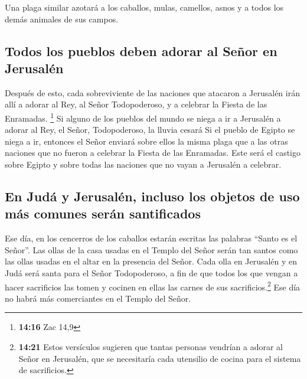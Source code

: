  Una plaga similar azotará a los caballos, mulas,
camellos, asnos y a todos los demás animales de sus campos.

\hypertarget{todos-los-pueblos-deben-adorar-al-seuxf1or-en-jerusaluxe9n}{%
\subsection{Todos los pueblos deben adorar al Señor en
Jerusalén}\label{todos-los-pueblos-deben-adorar-al-seuxf1or-en-jerusaluxe9n}}

 Después de esto, cada sobreviviente de las naciones que
atacaron a Jerusalén irán allí a adorar al Rey, al Señor Todopoderoso, y
a celebrar la Fiesta de las Enramadas. \footnote{\textbf{14:16} Zac 14,9}
 Si alguno de los pueblos del mundo se niega a ir a
Jerusalén a adorar al Rey, el Señor, Todopoderoso, la lluvia cesará
 Si el pueblo de Egipto se niega a ir, entonces el Señor
enviará sobre ellos la misma plaga que a las otras naciones que no
fueron a celebrar la Fiesta de las Enramadas.  Este será
el castigo sobre Egipto y sobre todas las naciones que no vayan a
Jerusalén a celebrar.

\hypertarget{en-juduxe1-y-jerusaluxe9n-incluso-los-objetos-de-uso-muxe1s-comunes-seruxe1n-santificados}{%
\subsection{En Judá y Jerusalén, incluso los objetos de uso más comunes
serán
santificados}\label{en-juduxe1-y-jerusaluxe9n-incluso-los-objetos-de-uso-muxe1s-comunes-seruxe1n-santificados}}

 Ese día, en los cencerros de los caballos estarán
escritas las palabras ``Santo es el Señor''. Las ollas de la casa usadas
en el Templo del Señor serán tan santos como las ollas usadas en el
altar en la presencia del Señor.  Cada olla en Jerusalén
y en Judá será santa para el Señor Todopoderoso, a fin de que todos los
que vengan a hacer sacrificios las tomen y cocinen en ellas las carnes
de sus sacrificios.\footnote{\textbf{14:21} Estos versículos sugieren
  que tantas personas vendrían a adorar al Señor en Jerusalén, que se
  necesitaría cada utensilio de cocina para el sistema de sacrificios.}
Ese día no habrá más comerciantes en el Templo del Señor.
